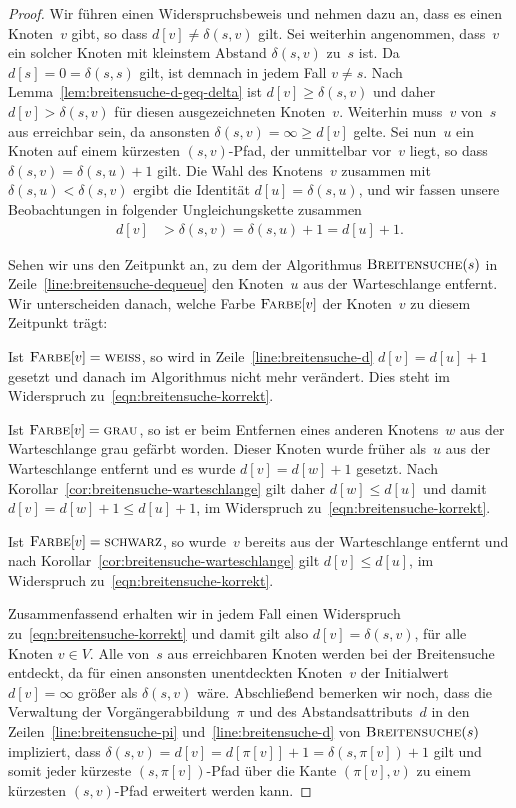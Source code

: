 \begin{proof}
Wir führen einen Widerspruchsbeweis und nehmen dazu an, dass es einen Knoten~$v$ gibt, so dass $d[v] \neq \delta(s,v)$ gilt.
Sei weiterhin angenommen, dass~$v$ ein solcher Knoten mit kleinstem Abstand $\delta(s,v)$ zu~$s$ ist.
Da $d[s]=0=\delta(s,s)$ gilt, ist demnach in jedem Fall $v \neq s$.
Nach Lemma~\ref{lem:breitensuche-d-geq-delta} ist $d[v] \geq \delta(s,v)$ und daher $d[v] > \delta(s,v)$ für diesen ausgezeichneten Knoten~$v$.
Weiterhin muss~$v$ von~$s$ aus erreichbar sein, da ansonsten $\delta(s,v)=\infty \geq d[v]$ gelte.
Sei nun~$u$ ein Knoten auf einem kürzesten $(s,v)$-Pfad, der unmittelbar vor~$v$ liegt, so dass $\delta(s,v)=\delta(s,u)+1$ gilt.
Die Wahl des Knotens~$v$ zusammen mit $\delta(s,u) < \delta(s,v)$ ergibt die Identität $d[u]=\delta(s,u)$, und wir fassen unsere Beobachtungen in folgender Ungleichungskette zusammen
\begin{align}
d[v] &> \delta(s,v) = \delta(s,u) + 1 = d[u] + 1.\label{eqn:breitensuche-korrekt}
\end{align}

Sehen wir uns den Zeitpunkt an, zu dem der Algorithmus $\mathop{\text{\textsc{Breitensuche}}}(s)$ in Zeile~\ref{line:breitensuche-dequeue} den Knoten~$u$ aus der Warteschlange entfernt.
Wir unterscheiden danach, welche Farbe $\mathop{\text{\textsc{Farbe}}}[v]$ der Knoten~$v$ zu diesem Zeitpunkt trägt:

Ist $\mathop{\text{\textsc{Farbe}}}[v]=\mathop{\text{\textsc{weiss}}}$, so wird in Zeile~\ref{line:breitensuche-d} $d[v]=d[u]+1$ gesetzt und danach im Algorithmus nicht mehr verändert.
Dies steht im Widerspruch zu~\eqref{eqn:breitensuche-korrekt}.

Ist $\mathop{\text{\textsc{Farbe}}}[v]=\mathop{\text{\textsc{grau}}}$, so ist er beim Entfernen eines anderen Knotens~$w$ aus der Warteschlange grau gefärbt worden.
Dieser Knoten wurde früher als~$u$ aus der Warteschlange entfernt und es wurde $d[v]=d[w]+1$ gesetzt.
Nach Korollar~\ref{cor:breitensuche-warteschlange} gilt daher $d[w] \leq d[u]$ und damit $d[v]=d[w]+1 \leq d[u]+1$, im Widerspruch zu~\eqref{eqn:breitensuche-korrekt}.

Ist $\mathop{\text{\textsc{Farbe}}}[v]=\mathop{\text{\textsc{schwarz}}}$, so wurde~$v$ bereits aus der Warteschlange entfernt und nach Korollar~\ref{cor:breitensuche-warteschlange} gilt $d[v] \leq d[u]$, im Widerspruch zu~\eqref{eqn:breitensuche-korrekt}.

Zusammenfassend erhalten wir in jedem Fall einen Widerspruch zu~\eqref{eqn:breitensuche-korrekt} und damit gilt also $d[v]=\delta(s,v)$, für alle Knoten $v \in V$.
Alle von~$s$ aus erreichbaren Knoten werden bei der Breitensuche entdeckt, da für einen ansonsten unentdeckten Knoten~$v$ der Initialwert $d[v]=\infty$ größer als $\delta(s,v)$ wäre.
Abschließend bemerken wir noch, dass die Verwaltung der Vorgängerabbildung~$\pi$ und des Abstandsattributs~$d$ in den Zeilen~\ref{line:breitensuche-pi} und~\ref{line:breitensuche-d} von $\mathop{\text{\textsc{Breitensuche}}}(s)$ impliziert, dass $\delta(s,v)=d[v]=d[\pi[v]]+1=\delta(s,\pi[v])+1$ gilt und somit jeder kürzeste $(s,\pi[v])$-Pfad über die Kante $(\pi[v],v)$ zu einem kürzesten $(s,v)$-Pfad erweitert werden kann.
\end{proof}

